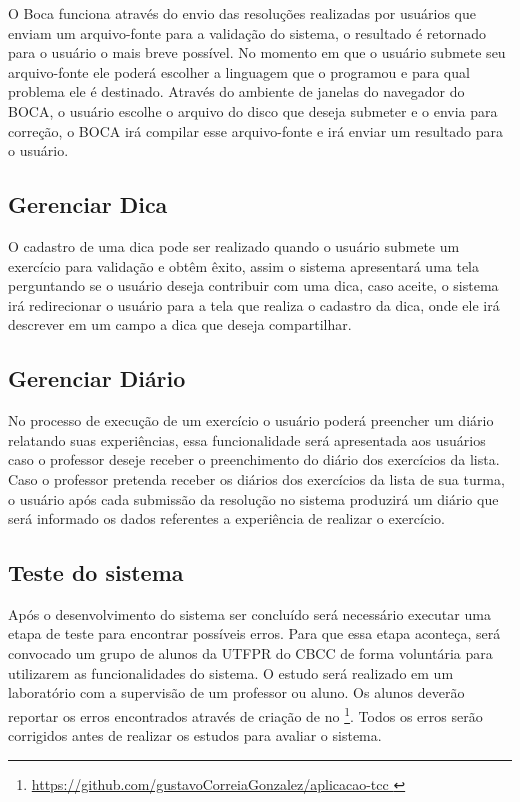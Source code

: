 O Boca funciona através do envio das resoluções realizadas por usuários que enviam um arquivo-fonte para a validação do sistema, o resultado é retornado para o usuário o mais breve possível. No momento em que o usuário submete seu arquivo-fonte ele poderá escolher a linguagem que o programou e para qual problema ele é destinado. Através do ambiente de janelas do navegador do BOCA, o usuário escolhe o arquivo do disco que deseja submeter e o envia para correção, o BOCA irá compilar esse arquivo-fonte e irá enviar um resultado para o usuário.

\subsection{Gerenciar Dica}

O cadastro de uma dica pode ser realizado quando o usuário submete um exercício para validação e obtêm êxito, assim o sistema apresentará uma tela perguntando se o usuário deseja contribuir com uma dica, caso aceite, o sistema irá redirecionar o usuário para a tela que realiza o cadastro da dica, onde ele irá descrever em um campo a dica que deseja compartilhar.

\subsection{Gerenciar Diário}

No processo de execução de um exercício o usuário poderá preencher um diário relatando suas experiências, essa funcionalidade será apresentada aos usuários caso o professor deseje receber o preenchimento do diário dos exercícios da lista. Caso o professor pretenda receber os diários dos exercícios da lista de sua turma, o usuário após cada submissão da resolução no sistema produzirá um diário que será informado os dados referentes a experiência de realizar o exercício. 

\subsection{Teste do sistema}

Após o desenvolvimento do sistema ser concluído será necessário executar uma etapa de teste para encontrar possíveis erros. Para que essa etapa aconteça, será convocado um grupo de alunos da UTFPR do CBCC de forma voluntária para utilizarem as funcionalidades do sistema. O estudo será realizado em um laboratório com a supervisão de um professor ou aluno. Os alunos deverão reportar os erros encontrados através de criação de  no  \footnote{\url{https://github.com/gustavoCorreiaGonzalez/aplicacao-tcc }}. Todos os erros serão corrigidos antes de realizar os estudos para avaliar o sistema.

